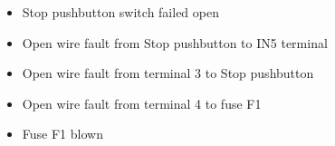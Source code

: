 \begin{itemize}
\item{} Stop pushbutton switch failed open
\item{} Open wire fault from Stop pushbutton to IN5 terminal
\item{} Open wire fault from terminal 3 to Stop pushbutton
\item{} Open wire fault from terminal 4 to fuse F1
\item{} Fuse F1 blown
\end{itemize}











